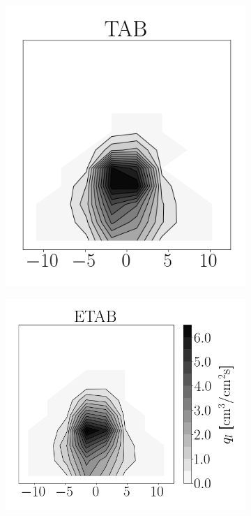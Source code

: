 \begin{figure}[t!]
\begin{subfigure}[b]{0.2\textwidth}
\end{subfigure}
\hspace*{0.02in}
\begin{subfigure}[b]{0.2\textwidth}
	\flushleft
   \includegraphics[scale=0.4]{./part2_developments/figures_ch6_lagrangian_JICF/params_breakup_model/maps/TAB_flux}
\end{subfigure}
\hspace*{0.02in}
\begin{subfigure}[b]{0.2\textwidth}
	\flushleft
   \includegraphics[scale=0.4]{./part2_developments/figures_ch6_lagrangian_JICF/params_breakup_model/maps/ETAB_flux}
\end{subfigure}


\end{figure}
